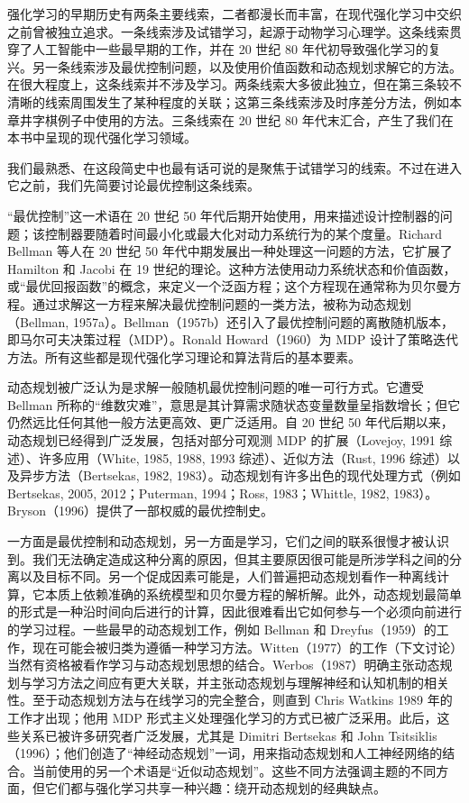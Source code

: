 \documentclass[UTF8, 12pt, fontset=fandol, oneside]{ctexart}
\begin{document}
强化学习的早期历史有两条主要线索，二者都漫长而丰富，在现代强化学习中交织之前曾被独立追求。一条线索涉及试错学习，起源于动物学习心理学。这条线索贯穿了人工智能中一些最早期的工作，并在 20 世纪 80 年代初导致强化学习的复兴。另一条线索涉及最优控制问题，以及使用价值函数和动态规划求解它的方法。在很大程度上，这条线索并不涉及学习。两条线索大多彼此独立，但在第三条较不清晰的线索周围发生了某种程度的关联；这第三条线索涉及时序差分方法，例如本章井字棋例子中使用的方法。三条线索在 20 世纪 80 年代末汇合，产生了我们在本书中呈现的现代强化学习领域。

我们最熟悉、在这段简史中也最有话可说的是聚焦于试错学习的线索。不过在进入它之前，我们先简要讨论最优控制这条线索。

“最优控制”这一术语在 20 世纪 50 年代后期开始使用，用来描述设计控制器的问题；该控制器要随着时间最小化或最大化对动力系统行为的某个度量。Richard Bellman 等人在 20 世纪 50 年代中期发展出一种处理这一问题的方法，它扩展了 Hamilton 和 Jacobi 在 19 世纪的理论。这种方法使用动力系统状态和价值函数，或“最优回报函数”的概念，来定义一个泛函方程；这个方程现在通常称为贝尔曼方程。通过求解这一方程来解决最优控制问题的一类方法，被称为动态规划（Bellman, 1957a）。Bellman（1957b）还引入了最优控制问题的离散随机版本，即马尔可夫决策过程（MDP）。Ronald Howard（1960）为 MDP 设计了策略迭代方法。所有这些都是现代强化学习理论和算法背后的基本要素。

动态规划被广泛认为是求解一般随机最优控制问题的唯一可行方式。它遭受 Bellman 所称的“维数灾难”，意思是其计算需求随状态变量数量呈指数增长；但它仍然远比任何其他一般方法更高效、更广泛适用。自 20 世纪 50 年代后期以来，动态规划已经得到广泛发展，包括对部分可观测 MDP 的扩展（Lovejoy, 1991 综述）、许多应用（White, 1985, 1988, 1993 综述）、近似方法（Rust, 1996 综述）以及异步方法（Bertsekas, 1982, 1983）。动态规划有许多出色的现代处理方式（例如 Bertsekas, 2005, 2012；Puterman, 1994；Ross, 1983；Whittle, 1982, 1983）。Bryson（1996）提供了一部权威的最优控制史。

一方面是最优控制和动态规划，另一方面是学习，它们之间的联系很慢才被认识到。我们无法确定造成这种分离的原因，但其主要原因很可能是所涉学科之间的分离以及目标不同。另一个促成因素可能是，人们普遍把动态规划看作一种离线计算，它本质上依赖准确的系统模型和贝尔曼方程的解析解。此外，动态规划最简单的形式是一种沿时间向后进行的计算，因此很难看出它如何参与一个必须向前进行的学习过程。一些最早的动态规划工作，例如 Bellman 和 Dreyfus（1959）的工作，现在可能会被归类为遵循一种学习方法。Witten（1977）的工作（下文讨论）当然有资格被看作学习与动态规划思想的结合。Werbos（1987）明确主张动态规划与学习方法之间应有更大关联，并主张动态规划与理解神经和认知机制的相关性。至于动态规划方法与在线学习的完全整合，则直到 Chris Watkins 1989 年的工作才出现；他用 MDP 形式主义处理强化学习的方式已被广泛采用。此后，这些关系已被许多研究者广泛发展，尤其是 Dimitri Bertsekas 和 John Tsitsiklis（1996）；他们创造了“神经动态规划”一词，用来指动态规划和人工神经网络的结合。当前使用的另一个术语是“近似动态规划”。这些不同方法强调主题的不同方面，但它们都与强化学习共享一种兴趣：绕开动态规划的经典缺点。
\end{document}
